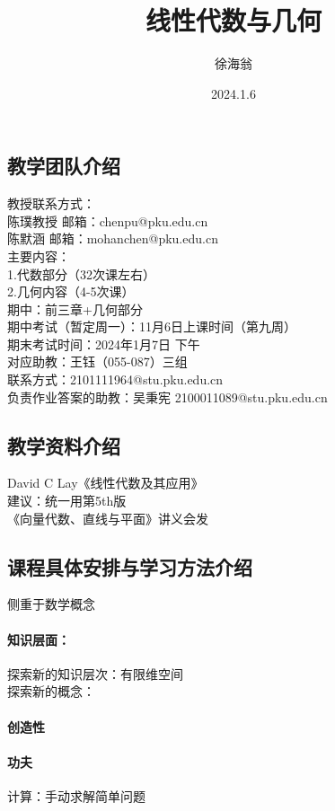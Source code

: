 \documentclass{article}
\title{线性代数与几何}
\author{徐海翁}
\date{2024.1.6}
\begin{document}
\begin{CJK}{UTF8}{gkai}

\maketitle
\subsection{教学团队介绍}
教授联系方式：\\
陈璞教授
邮箱：chenpu@pku.edu.cn\\
陈默涵
邮箱：mohanchen@pku.edu.cn\\
主要内容：\\
1.代数部分（32次课左右）\\
2.几何内容（4-5次课）\\
期中：前三章+几何部分\\
期中考试（暂定周一）：11月6日上课时间（第九周）\\
期末考试时间：2024年1月7日 下午\\
对应助教：王钰（055-087）三组\\
联系方式：2101111964@stu.pku.edu.cn\\
负责作业答案的助教：吴秉宪 2100011089@stu.pku.edu.cn\\
\subsection{教学资料介绍}
David C Lay《线性代数及其应用》\\
建议：统一用第5th版\\
《向量代数、直线与平面》讲义会发\\
\subsection{课程具体安排与学习方法介绍}
侧重于数学概念\\
\paragraph{知识层面：}
探索新的知识层次：有限维空间\\
探索新的概念：\\
\paragraph{创造性}
\paragraph{功夫}
计算：手动求解简单问题\\

\end{CJK}
\end{document}
